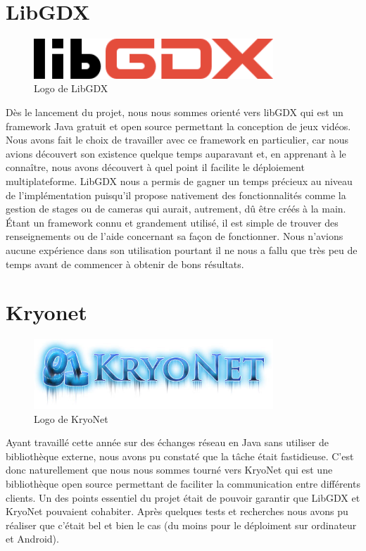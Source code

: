 \documentclass{report}
\begin{document}
\chapter{LibGDX}
\begin{figure}[H]
	\centering\includegraphics[width=9cm]{libgdx}
	\caption{Logo de LibGDX}
\end{figure}
Dès le lancement du projet, nous nous sommes orienté vers libGDX qui est un
framework Java gratuit et open source permettant la conception de jeux vidéos.
Nous avons fait le choix de travailler avec ce framework en particulier, car
nous avions découvert son existence quelque temps auparavant et, en apprenant à le connaître,
nous avons découvert à quel point il facilite le déploiement multiplateforme.
LibGDX nous a permis de gagner un temps précieux au niveau de l’implémentation
puisqu’il propose nativement des fonctionnalités comme la gestion de stages ou
de cameras qui aurait, autrement, dû être créés à la main.
Étant un framework connu et grandement utilisé, il est simple de trouver des
renseignements ou de l’aide concernant sa façon de fonctionner. Nous n’avions
aucune expérience dans son utilisation pourtant il ne nous a fallu que très peu
 de temps avant de commencer à obtenir de bons résultats.

\chapter{Kryonet}
\begin{figure}[H]
	\centering\includegraphics[width=9cm]{kryonet}
	\caption{Logo de KryoNet}
\end{figure}
Ayant travaillé cette année sur des échanges réseau en Java sans utiliser de bibliothèque externe, nous avons pu constaté que la tâche était fastidieuse. C'est donc naturellement que nous
nous sommes tourné vers KryoNet qui est une bibliothèque open source permettant de faciliter la communication entre différents clients. Un des points essentiel du projet était de pouvoir
garantir que LibGDX et KryoNet pouvaient cohabiter. Après quelques tests et recherches nous avons pu réaliser que c'était bel et bien le cas (du moins pour le déploiment sur ordinateur et Android).
\end{document}
